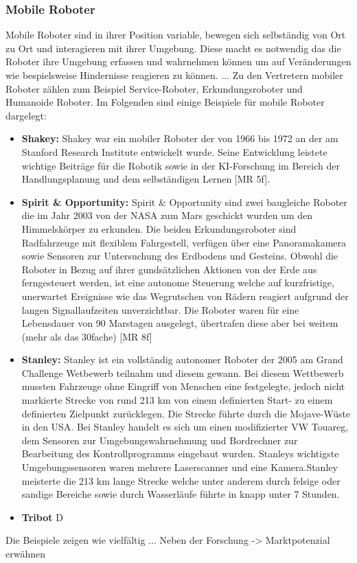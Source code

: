 \subsubsection{Mobile Roboter}
\color{process}
Mobile Roboter sind in ihrer Position variable, bewegen sich selbständig von
Ort zu Ort und interagieren mit ihrer Umgebung. Diese macht es notwendig das die Roboter ihre Umgebung erfassen und wahrnehmen können um auf Veränderungen wie bespielsweise Hindernisse reagieren zu können. \newline
...
\newline
Zu den Vertretern mobiler Roboter zählen zum Beispiel Service-Roboter, Erkundungsroboter und Humanoide Roboter. Im Folgenden sind einige Beispiele
für mobile Roboter dargelegt:
\begin{itemize}
	\item{\textbf{Shakey:}} Shakey war ein mobiler Roboter der von 1966 bis 1972 an der am Stanford Research Institute entwickelt wurde. Seine Entwicklung leistete wichtige Beiträge für die Robotik sowie in der KI-Forschung im Bereich der Handlungsplanung und dem selbständigen Lernen [MR 5f].
	\item{\textbf{Spirit \& Opportunity:}} Spirit \& Opportunity sind zwei baugleiche Roboter die im Jahr 2003 von der NASA zum Mars geschickt wurden um den Himmelskörper zu erkunden. Die beiden Erkundungsroboter sind Radfahrzeuge mit flexiblem Fahrgestell, verfügen über eine Panoramakamera sowie Sensoren zur Untersuchung des Erdbodens und Gesteins. Obwohl die Roboter in Bezug auf ihrer gundsätzlichen Aktionen von der Erde aus ferngesteuert werden, ist eine autonome Steuerung welche auf kurzfristige, unerwartet Ereignisse wie das Wegrutschen von Rädern reagiert aufgrund der langen Signallaufzeiten unverzichtbar. Die Roboter waren für eine
	Lebensdauer von 90 Marstagen ausgelegt, übertrafen diese aber bei weitem (mehr als das 30fache) [MR 8f]
	\item{\textbf{Stanley:}} Stanley ist ein vollständig autonomer Roboter der 2005 am Grand Challenge Wetbewerb teilnahm und diesem gewann. Bei diesem Wettbewerb mussten Fahrzeuge ohne Eingriff von Menschen eine festgelegte, jedoch nicht markierte Strecke von rund 213 km von einem definierten Start- zu einem definierten Zielpunkt zurücklegen. Die Strecke führte durch 
	die Mojave-Wüste in den USA. Bei Stanley handelt es sich um einen modifizierter VW Touareg, dem Sensoren zur Umgebungswahrnehmung und Bordrechner zur Bearbeitung des Kontrollprogramms eingebaut wurden. Stanleys wichtigste Umgebungssensoren waren mehrere Laserscanner und eine Kamera.Stanley meisterte die 213 km lange Strecke welche unter anderem durch felsige
	oder sandige Bereiche sowie durch Wasserläufe führte in knapp unter 7 Stunden.
	\item{\textbf{Tribot}} D
\end{itemize}
Die Beispiele zeigen wie vielfältig ...
Neben der Forschung -> Marktpotenzial erwähnen
